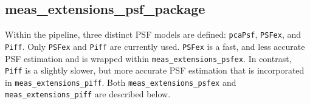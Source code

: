 \subsection{meas\_extensions\_psf\_package}


Within the pipeline, three distinct PSF models are defined:  \texttt{pcaPsf}, \texttt{PSFex}, and \texttt{Piff}. Only 
 \texttt{PSFex} and \texttt{Piff} are currently used. \texttt{PSFex} is 
a fast, and less accurate PSF estimation and is wrapped within \texttt{meas\_extensions\_psfex}. 
In contrast, \texttt{Piff} is a slightly slower, but more accurate PSF estimation that is incorporated 
in \texttt{meas\_extensions\_piff}. Both \texttt{meas\_extensions\_psfex} and \texttt{meas\_extensions\_piff} are described below.




